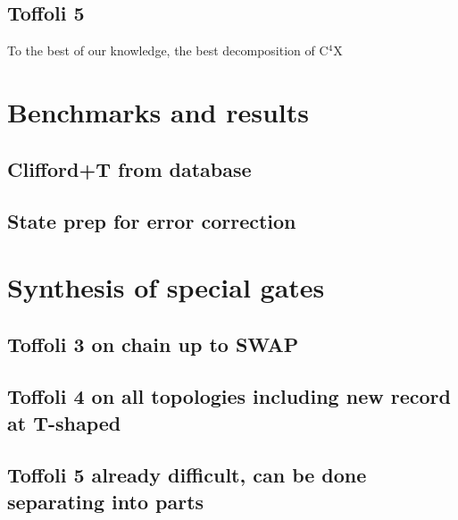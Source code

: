 \documentclass[amsfonts, amssymb, aps, nofootinbib]{revtex4-2}
\newcommand{\cx}[1]{C${}^{#1}$X}
\begin{document}
\subsection{Toffoli 5}
To the best of our knowledge, the best decomposition of \cx{4}

\section{Benchmarks and results}
\subsection{Clifford+T from database}
\subsection{State prep for error correction}
\section{Synthesis of special gates}
\subsection{Toffoli 3 on chain up to SWAP}
\subsection{Toffoli 4 on all topologies including new record at T-shaped}
\subsection{Toffoli 5 already difficult, can be done separating into parts}


\end{document}
